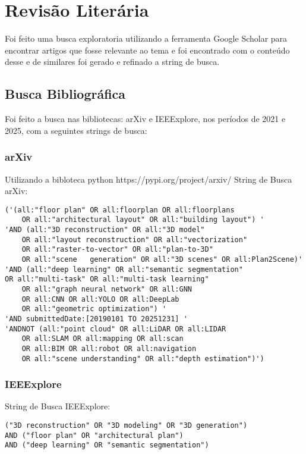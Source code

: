 \chapter{Revisão Literária}\label{cp:revisaoliteraria}
Foi feito uma busca exploratoria utilizando a ferramenta Google Scholar  para encontrar artigos que fosse relevante ao tema e foi encontrado \cite{kratochvila2024multi} com o conteúdo desse e de similares foi gerado e refinado a string de busca.

\section{Busca Bibliográfica}\label{cp:refteory:figuras}
Foi feito a busca nas bibliotecas: arXiv e IEEExplore, nos períodos de 2021 e 2025, com a seguintes strings de busca:
   
\subsection{arXiv}
Utilizando a bibloteca python https://pypi.org/project/arxiv/
String de Busca arXiv: 
\begin{verbatim}
('(all:"floor plan" OR all:floorplan OR all:floorplans 
    OR all:"architectural layout" OR all:"building layout") ' 
'AND (all:"3D reconstruction" OR all:"3D model" 
    OR all:"layout reconstruction" OR all:"vectorization" 
    OR all:"raster-to-vector" OR all:"plan-to-3D" 
    OR all:"scene   generation" OR all:"3D scenes" OR all:Plan2Scene)'
'AND (all:"deep learning" OR all:"semantic segmentation" 
OR all:"multi-task" OR all:"multi-task learning" 
    OR all:"graph neural network" OR all:GNN 
    OR all:CNN OR all:YOLO OR all:DeepLab 
    OR all:"geometric optimization") '
'AND submittedDate:[20190101 TO 20251231] '
'ANDNOT (all:"point cloud" OR all:LiDAR OR all:LIDAR  
    OR all:SLAM OR all:mapping OR all:scan 
    OR all:BIM OR all:robot OR all:navigation 
    OR all:"scene understanding" OR all:"depth estimation")')
\end{verbatim}
\subsection{IEEExplore}
String de Busca IEEExplore:
\begin{verbatim}
("3D reconstruction" OR "3D modeling" OR "3D generation") 
AND ("floor plan" OR "architectural plan") 
AND ("deep learning" OR "semantic segmentation")
\end{verbatim}

